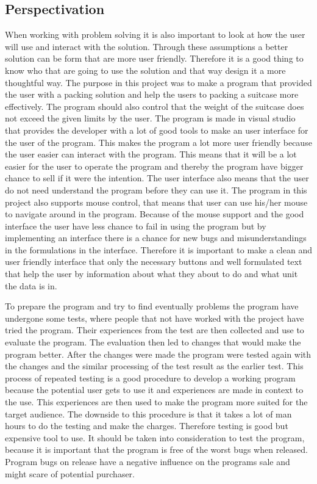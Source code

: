 \subsection{Perspectivation}
When working with problem solving it is also important to look at how the user will use and interact with the solution. Through these assumptions a better solution can be form that are more user friendly. Therefore it is a good thing to know who that are going to use the solution and that way design it a more thoughtful way.
The purpose in this project was to make a program that provided the user with a packing solution and help the users to packing a suitcase more effectively. The program should also control that the weight of the suitcase does not exceed the given limits by the user. The program is made in visual studio that provides the developer with a lot of good tools to make an user interface for the user of the program.
This makes the program a lot more user friendly because the user easier can interact with the program. This means that it will be a lot easier for the user to operate the program and thereby the program have bigger chance to sell if it were the intention.
The user interface also means that the user do not need understand the program before they can use it.
The program in this project also supports mouse control, that means that user can use his/her mouse to navigate around in the program. Because of the mouse support and the good interface the user have less chance to fail in using the program but by implementing an interface there is a chance for new bugs and misunderstandings in the formulations in the interface.
Therefore it is important to make a clean and user friendly interface that only the necessary buttons and well formulated text that help the user by information about what they about to do and what unit the data is in.

To prepare the program and try to find eventually problems the program have undergone some tests, where people that not have worked with the project have tried the program. Their experiences from the test are then collected and use to evaluate the program. The evaluation then led to changes that would make the program better. After the changes were made the program were tested again with the changes and the similar processing of the test result as the earlier test.
This process of repeated testing is a good procedure to develop a working program because the potential user gets to use it and experiences are made in context to the use. This experiences are then used to make the program more suited for the target audience. The downside to this procedure is that it takes a lot of man hours to do the testing and make the charges. Therefore testing is good but expensive tool to use.
It should be taken into consideration to test the program, because it is important that the program is free of the worst bugs when released. Program bugs on release have a negative influence on the programs sale and might scare of potential purchaser.

